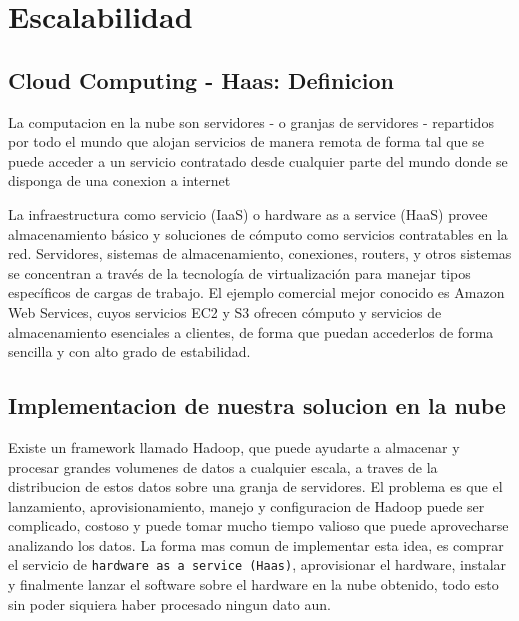 \documentclass{article}
\begin{document}
\section{Escalabilidad}

\subsection{Cloud Computing - Haas: Definicion}
La computacion en la nube son servidores - o granjas de servidores - repartidos por todo el mundo que alojan servicios de manera remota de forma tal que se puede acceder a un servicio contratado desde cualquier parte del mundo donde se disponga de una conexion a internet

La infraestructura como servicio (IaaS) o hardware as a service (HaaS) provee almacenamiento b\'asico y soluciones de c\'omputo como servicios contratables en la red.
Servidores, sistemas de almacenamiento, conexiones, routers, y otros sistemas se concentran a trav\'es de la tecnolog\'ia de virtualizaci\'on para manejar tipos espec\'ificos de cargas de trabajo. El ejemplo comercial mejor conocido es Amazon Web Services, cuyos servicios EC2 y S3 ofrecen c\'omputo y servicios de almacenamiento esenciales a clientes, de forma que puedan accederlos de forma sencilla y con alto grado de estabilidad. 

\subsection{Implementacion de nuestra solucion en la nube}
Existe un framework llamado Hadoop, que puede ayudarte a almacenar y procesar grandes volumenes de datos a cualquier escala, a traves de la distribucion de estos datos sobre una granja de servidores. El problema es que el lanzamiento, aprovisionamiento, manejo y configuracion de Hadoop puede ser complicado, costoso y puede tomar mucho tiempo valioso que puede aprovecharse analizando los datos. La forma mas comun de implementar esta idea, es comprar el servicio de \verb|hardware as a service (Haas)|, aprovisionar el hardware, instalar y finalmente lanzar el software sobre el hardware en la nube obtenido, todo esto sin poder siquiera haber procesado ningun dato aun.\\
\end{document}
